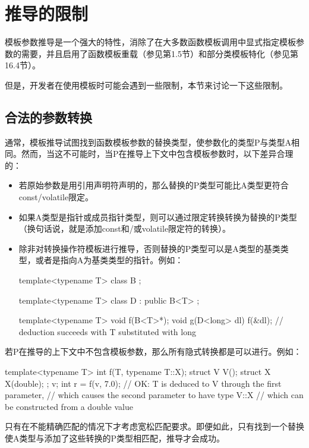 \section{推导的限制}


模板参数推导是一个强大的特性，消除了在大多数函数模板调用中显式指定模板参数的需要，并且启用了函数模板重载（参见第1.5节）和部分类模板特化（参见第16.4节）。

但是，开发者在使用模板时可能会遇到一些限制，本节来讨论一下这些限制。

\subsection{合法的参数转换}

通常，模板推导试图找到函数模板参数的替换类型，使参数化的类型P与类型A相同。然而，当这不可能时，当P在推导上下文中包含模板参数时，以下差异合理的：

\begin{itemize}
\item 
若原始参数是用引用声明符声明的，那么替换的P类型可能比A类型更符合const/volatile限定。

\item 
如果A类型是指针或成员指针类型，则可以通过限定转换转换为替换的P类型（换句话说，就是添加const和/或volatile限定符的转换）。

\item 
除非对转换操作符模板进行推导，否则替换的P类型可以是A类型的基类类型，或者是指向A为基类类型的指针。例如：

\begin{cpp}
template<typename T>
class B {};

template<typename T>
class D : public B<T> {};

template<typename T> void f(B<T>*);
void g(D<long> dl) {
	f(&dl); // deduction succeeds with T substituted with long
}
\end{cpp}
\end{itemize}

若P在推导的上下文中不包含模板参数，那么所有隐式转换都是可以进行。例如：

\begin{cpp}
template<typename T> int f(T, typename T::X);
struct V {
	V();
	struct X {
		X(double);
	};
} v;
int r = f(v, 7.0); // OK: T is deduced to V through the first parameter,
					// which causes the second parameter to have type V::X
					// which can be constructed from a double value
\end{cpp}

只有在不能精确匹配的情况下才考虑宽松匹配要求。即便如此，只有找到一个替换使A类型与添加了这些转换的P类型相匹配，推导才会成功。

